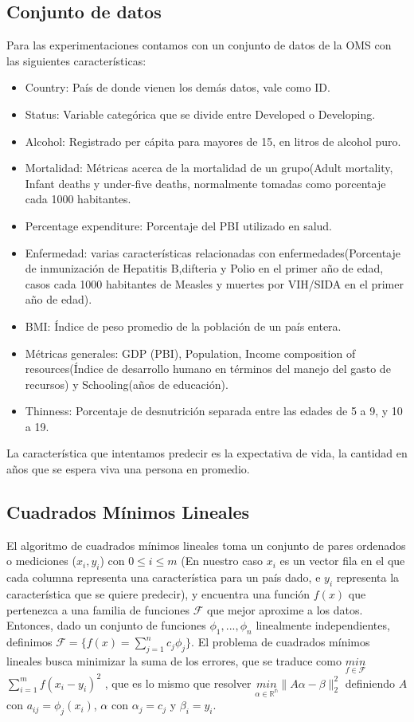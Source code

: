     \subsection{Conjunto de datos}
    Para las experimentaciones contamos con un conjunto de datos de la OMS con las siguientes características:
    \begin{itemize}
     \item Country: País de donde vienen los demás datos, vale como ID.
     \item  Status: Variable categórica que se divide entre Developed o Developing.
     \item  Alcohol: Registrado per cápita para mayores de 15, en litros de alcohol puro.
     \item Mortalidad: Métricas acerca de la mortalidad de un grupo(Adult mortality, Infant deaths y under-five deaths, normalmente tomadas como porcentaje cada 1000 habitantes.
     \item Percentage expenditure: Porcentaje del PBI utilizado en salud.
     \item Enfermedad: varias características relacionadas con enfermedades(Porcentaje de inmunización de Hepatitis B,difteria y Polio en el primer año de edad, casos cada 1000 habitantes de Measles y muertes por VIH/SIDA en el primer año de edad).
     \item BMI: Índice de peso promedio de la población de un país entera.
     \item Métricas generales: GDP (PBI), Population, Income composition of resources(Índice de desarrollo humano en términos del manejo del gasto de recursos) y Schooling(años de educación).
     \item Thinness: Porcentaje de desnutrición separada entre las edades de 5 a 9, y 10 a 19.
    \end{itemize}
    
    La característica que intentamos predecir es la expectativa de vida, la cantidad en años que se espera viva una persona en promedio.
    \subsection{Cuadrados Mínimos Lineales}\label{sec:into_CML}
    El algoritmo de cuadrados mínimos lineales toma un conjunto de pares ordenados o mediciones ($x_{i},y_{i}$) con $0\leq i\leq m$ (En nuestro caso $x_{i}$ es un vector fila en el que cada columna representa una característica para un país dado, e $y_{i}$ representa la característica que se quiere predecir), y encuentra una función $f(x)$ que pertenezca a una familia de funciones $\mathcal{F}$ que mejor aproxime a los datos.
    Entonces, dado un conjunto de funciones ${\phi_{1}, . . . ,\phi_{n}}$ linealmente independientes, definimos $\mathcal{F} = \{ f (x) = \sum_{j=1}^{n}{c_{j} \phi_{j}} \}.$ El problema de cuadrados mínimos lineales busca minimizar la suma de los errores, que se traduce como $\underset{f\in \mathcal{F}}{min}$ $\sum_{i=1}^{m}{f(x_{i}-y_{i})^{2}}$ , que es lo mismo que resolver $\underset{\alpha \in \mathbb{R^{n}}}{min} \lVert A\alpha-\beta \rVert^{2}_{2}$ definiendo $A$ con $a_{ij} = \phi_{j}(x_{i})$, $\alpha$ con $\alpha_{j}=c_{j}$ y $\beta_{i}=y_{i}$.
    

